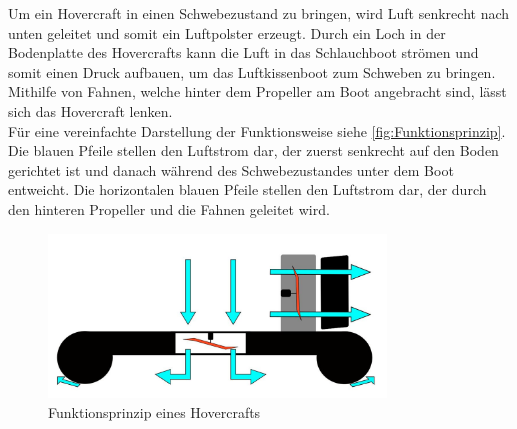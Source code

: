 Um ein Hovercraft in einen Schwebezustand zu bringen, wird Luft senkrecht nach unten geleitet und somit ein Luftpolster erzeugt.
Durch ein Loch in der Bodenplatte des Hovercrafts kann die Luft in das Schlauchboot strömen und somit einen Druck aufbauen, um das Luftkissenboot zum Schweben zu bringen. \\
Mithilfe von Fahnen, welche hinter dem Propeller am Boot angebracht sind, lässt sich das Hovercraft lenken. \\ Für eine vereinfachte Darstellung der Funktionsweise siehe 
\autoref{fig:Funktionsprinzip}. Die blauen Pfeile stellen den Luftstrom dar, der zuerst senkrecht auf den Boden gerichtet ist und danach während des Schwebezustandes unter dem Boot
entweicht. Die horizontalen blauen Pfeile stellen den Luftstrom dar, der durch den hinteren Propeller und die Fahnen geleitet wird. 

\begin{figure}[H]
  \centering
  \includegraphics[width=0.8\textwidth]{Fotos/Funktionsprinzip.JPG}
  \caption{Funktionsprinzip eines Hovercrafts  \label{fig:Funktionsprinzip}}
\end{figure}